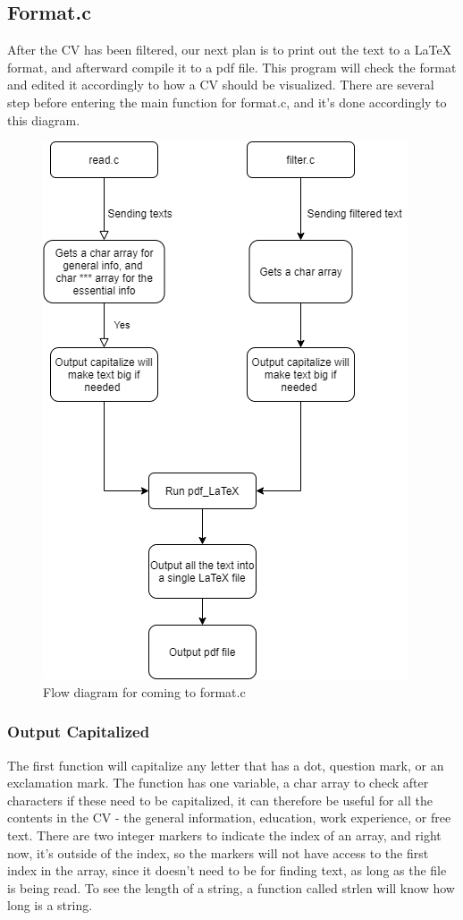 \subsection{Format.c}
After the CV has been filtered, our next plan is to print out the text to a LaTeX format, and afterward compile it to a pdf file. 
This program will check the format and edited it accordingly to how a CV should be visualized. 
There are several step before entering the main function for format.c,
and it's done accordingly to this diagram.
\begin{figure}[H]
  \centering
  \includegraphics[scale = 0.6]{figures/Fra_read.c_og_filter.c_format.c}
  \caption{Flow diagram for coming to format.c}
\end{figure}

\subsubsection{Output Capitalized}
The first function will capitalize any letter that has a dot, question mark, or an exclamation mark.
The function has one variable, a char array to check after characters if these need to be capitalized,
it can therefore be useful for all the contents in the CV - the general information, education, work experience, or free text.
There are two integer markers to indicate the index of an array, 
and right now, it's outside of the index, so the markers will not have access to the first index in the array,
since it doesn't need to be for finding text, as long as the file is being read.
To see the length of a string, a function called strlen will know how long is a string. \\

